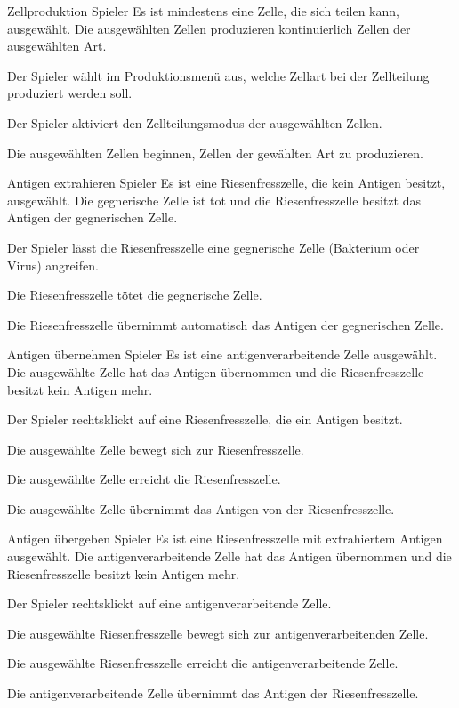 \actionentry
{Zellproduktion}
{Spieler}
{Es ist mindestens eine Zelle, die sich teilen kann, ausgewählt.}
{
  Die ausgewählten Zellen produzieren kontinuierlich Zellen der ausgewählten
  Art.
}
{
  \begin{compactenum}
    \item Der Spieler wählt im Produktionsmenü aus, welche Zellart bei
      der Zellteilung produziert werden soll.
    \item Der Spieler aktiviert den Zellteilungsmodus der ausgewählten
      Zellen.
    \item Die ausgewählten Zellen beginnen, Zellen der gewählten Art zu
      produzieren.
  \end{compactenum}
}

\actionentry
{Antigen extrahieren}
{Spieler}
{Es ist eine Riesenfresszelle, die kein Antigen besitzt, ausgewählt.}
{
  Die gegnerische Zelle ist tot und die Riesenfresszelle besitzt das Antigen
  der gegnerischen Zelle.
}
{
  \begin{compactenum}
    \item Der Spieler lässt die Riesenfresszelle eine gegnerische Zelle
      (Bakterium oder Virus) angreifen.
    \item Die Riesenfresszelle tötet die gegnerische Zelle.
    \item Die Riesenfresszelle übernimmt automatisch das Antigen der
      gegnerischen Zelle.
  \end{compactenum}
}

\actionentry
{Antigen übernehmen}
{Spieler}
{Es ist eine antigenverarbeitende Zelle ausgewählt.}
{
  Die ausgewählte Zelle hat das Antigen übernommen und die Riesenfresszelle
  besitzt kein Antigen mehr.
}
{
  \begin{compactenum}
    \item Der Spieler rechtsklickt auf eine Riesenfresszelle, die ein Antigen
      besitzt.
    \item Die ausgewählte Zelle bewegt sich zur Riesenfresszelle.
    \item Die ausgewählte Zelle erreicht die Riesenfresszelle.
    \item Die ausgewählte Zelle übernimmt das Antigen von der Riesenfresszelle.
  \end{compactenum}
}

\actionentry
{Antigen übergeben}
{Spieler}
{Es ist eine Riesenfresszelle mit extrahiertem Antigen ausgewählt.}
{
  Die antigenverarbeitende Zelle hat das Antigen übernommen und die
  Riesenfresszelle besitzt kein Antigen mehr.
}
{
  \begin{compactenum}
    \item Der Spieler rechtsklickt auf eine antigenverarbeitende Zelle.
    \item Die ausgewählte Riesenfresszelle bewegt sich zur
      antigenverarbeitenden Zelle.
    \item Die ausgewählte Riesenfresszelle erreicht die antigenverarbeitende
      Zelle.
    \item Die antigenverarbeitende Zelle übernimmt das Antigen der
      Riesenfresszelle.
  \end{compactenum}
}

